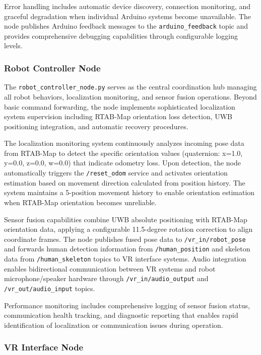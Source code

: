 Error handling includes automatic device discovery, connection monitoring, and graceful degradation when individual Arduino systems become unavailable. The node publishes Arduino feedback messages to the \texttt{arduino\_feedback} topic and provides comprehensive debugging capabilities through configurable logging levels.

\subsubsection{Robot Controller Node}

The \texttt{robot\_controller\_node.py} serves as the central coordination hub managing all robot behaviors, localization monitoring, and sensor fusion operations. Beyond basic command forwarding, the node implements sophisticated localization system supervision including RTAB-Map orientation loss detection, UWB positioning integration, and automatic recovery procedures.

The localization monitoring system continuously analyzes incoming pose data from RTAB-Map to detect the specific orientation values (quaternion: x=1.0, y=0.0, z=0.0, w=0.0) that indicate odometry loss. Upon detection, the node automatically triggers the \texttt{/reset\_odom} service and activates orientation estimation based on movement direction calculated from position history. The system maintains a 5-position movement history to enable orientation estimation when RTAB-Map orientation becomes unreliable.

Sensor fusion capabilities combine UWB absolute positioning with RTAB-Map orientation data, applying a configurable 11.5-degree rotation correction to align coordinate frames. The node publishes fused pose data to \texttt{/vr\_in/robot\_pose} and forwards human detection information from \texttt{/human\_position} and skeleton data from \texttt{/human\_skeleton} topics to VR interface systems. Audio integration enables bidirectional communication between VR systems and robot microphone/speaker hardware through \texttt{/vr\_in/audio\_output} and \texttt{/vr\_out/audio\_input} topics.

Performance monitoring includes comprehensive logging of sensor fusion status, communication health tracking, and diagnostic reporting that enables rapid identification of localization or communication issues during operation.

\subsubsection{VR Interface Node}

